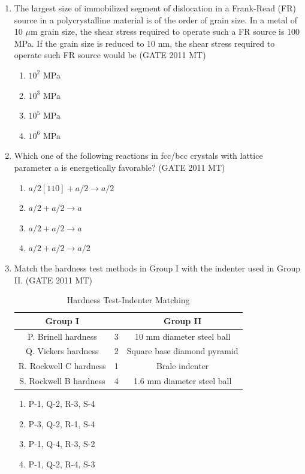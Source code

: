 \documentclass[12pt]{article}
\begin{document}
\begin{enumerate}
\item The largest size of immobilized segment of dislocation in a Frank-Read (FR) source in a polycrystalline material is of the order of grain size. In a metal of 10 $\mu$m grain size, the shear stress required to operate such a FR source is 100 MPa. If the grain size is reduced to 10 nm, the shear stress required to operate such FR source would be (GATE 2011 MT)
    \begin{enumerate}
        \item $10^{2}$ MPa
        \item $10^{3}$ MPa
        \item $10^{5}$ MPa
        \item $10^{6}$ MPa
    \end{enumerate}
\item Which one of the following reactions in fcc/bcc crystals with lattice parameter a is energetically favorable? (GATE 2011 MT)
    \begin{enumerate}
        \item $a/2 [110] + a/2  \to a/2 $
        \item $a/2  + a/2  \to a $
        \item $a/2  + a/2  \to a $
        \item $a/2  + a/2  \to a/2 $
    \end{enumerate}

\item Match the hardness test methods in Group I with the indenter used in Group II. (GATE 2011 MT)
\begin{table}[h]
\centering
\caption{Hardness Test-Indenter Matching}
\begin{tabular}{|c|c|c|}
\hline
\textbf{Group I} & & \textbf{Group II} \\
\hline
P. Brinell hardness & 3 & 10 mm diameter steel ball \\
Q. Vickers hardness & 2 & Square base diamond pyramid \\
R. Rockwell C hardness & 1 & Brale indenter \\
S. Rockwell B hardness & 4 & 1.6 mm diameter steel ball \\
\hline
\end{tabular}
\end{table}
\begin{enumerate}[label=(\Alph*)]
    \item P-1, Q-2, R-3, S-4
    \item P-3, Q-2, R-1, S-4
    \item P-1, Q-4, R-3, S-2
    \item P-1, Q-2, R-4, S-3
\end{enumerate}


\end{enumerate}
\end{document}
